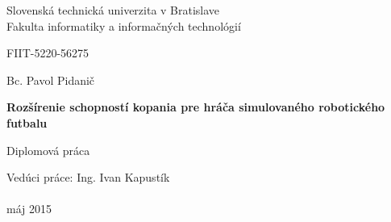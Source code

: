 \begin{titlepage}
	\begin{center}
	\large Slovenská technická univerzita v Bratislave 
	\normalsize \\
\large Fakulta informatiky a informačných technológií
	\end{center}
	\begin{center}
	  FIIT-5220-56275
	\end{center}
	\vfill
	\begin{center}
	
\begin{center}
\Large Bc. Pavol Pidanič
\end{center}
	
\begin{center}
\LARGE \textbf{Rozšírenie schopností kopania pre hráča simulovaného robotického futbalu}
\end{center}
\begin{center}
\large Diplomová práca
\end{center}
\linespread{1.3}
	\end{center}
	\vfill
	Vedúci práce: Ing. Ivan Kapustík \\\\
	máj 2015
\end{titlepage}
